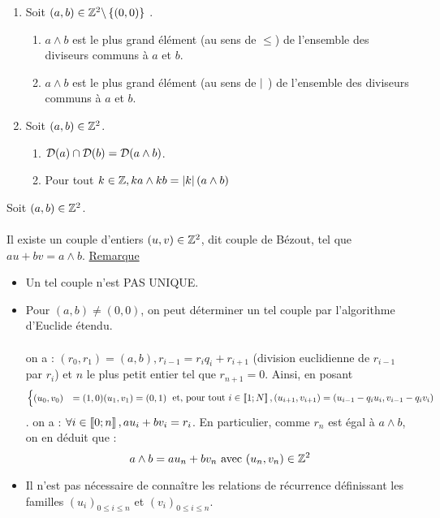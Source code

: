 \begin{defprop}
	\begin{enumerate}
		\item Soit \((a, b) \in \mathbb{Z}^2 \backslash \left\lbrace(0, 0)\right\rbrace\) .
		      \begin{enumerate}
			      \item \(a \wedge b\) est le plus grand élément (au sens de \(\leq\)) de l’ensemble des diviseurs communs à \(a\) et \(b\).
			      \item \(a \wedge b\) est le plus grand élément (au sens de \(\mid\) ) de l’ensemble des diviseurs communs à \(a\) et \(b\).
		      \end{enumerate}
		\item Soit \((a, b) \in \mathbb{Z}^2\).
		      \begin{enumerate}
			      \item \(\mathcal{D}(a) \cap \mathcal{D}(b) = \mathcal{D}(a \wedge b)\).
			      \item Pour tout \(k \in \mathbb{Z}, ka \wedge kb = \left\lvert k\right\rvert (a \wedge b) \)
		      \end{enumerate}
	\end{enumerate}
\end{defprop}

\begin{defprop}
	Soit \((a, b) \in \mathbb{Z}^2\).\\~\\
	Il existe un couple d’entiers \((u, v) \in \mathbb{Z}^2\), dit couple de Bézout, tel que \(au + bv = a \wedge b\).
	\underline{Remarque}
	\begin{itemize}
		\item  Un tel couple n’est PAS UNIQUE.
		\item  Pour \((a, b) \neq (0, 0)\), on peut déterminer un tel couple par l’algorithme d’Euclide étendu.\\~\\
		      on a : \((r_0, r_1) = (a, b), r_{i-1} = r_iq_i + r_{i+1}\) (division euclidienne de \(r_{i-1}\) par \(r_i\)) et \(n\) le plus petit entier tel que \(r_{n+1} = 0\). Ainsi, en posant
		      \[\begin{cases}
				      (u_0, v_0) & = (1, 0)
				      (u_1, v_1) = (0, 1)\end{cases}\text{ et, pour tout }i \in \left\llbracket1;N\right\rrbracket , (u_{i+1}, v_{i+1}) = (u_{i-1} - q_i u_i, v_{i-1} - q_iv_i)\] .
		      on a : \(\forall i \in \left\llbracket0;n\right\rrbracket , a u_i + b v_i = r_i\). En particulier, comme \(r_n\) est égal à \(a \wedge b\), on en déduit que :
		      \[a \wedge b = au_n + bv_n\text{ avec }(u_n, v_n) \in \mathbb{Z}^2\]
		\item Il n’est pas nécessaire de connaître les relations de récurrence définissant les familles \( (u_i)_{0\leq i \leq n}\) et \((v_i)_{0\leq i \leq n}\).
	\end{itemize}
\end{defprop}

